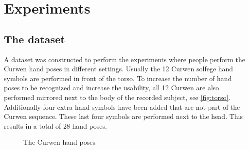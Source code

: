 
\chapter{Experiments}
\label{ch:experiments}


\section{The dataset}
A dataset was constructed to perform the experiments where people perform the Curwen hand poses in different settings. Usually the 12 Curwen solfege hand symbols are performed in front of the torso. To increase the number of hand poses to be recognized and increase the usability, all 12 Curwen are also performed mirrored next to the body of the recorded subject, see \autoref{fig:torso}. Additionally four extra hand symbols have been added that are not part of the Curwen sequence. These last four symbols are performed next to the head. This results in a total of 28 hand poses.

\begin{figure}[htbp]
  \centering
\hspace{0.03\linewidth}
  \caption{The Curwen hand poses}
  \label{fig:torso}
\end{figure}


